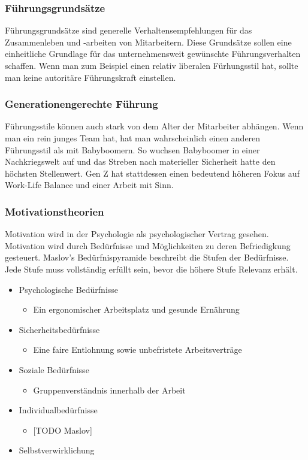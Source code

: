 \documentclass{article}
\begin{document}
	 \subsubsection{Führungsgrundsätze}
	 Führungsgrundsätze sind generelle Verhaltensempfehlungen für das Zusammenleben und -arbeiten von Mitarbeitern. Diese Grundsätze sollen eine einheitliche Grundlage für das unternehmensweit gewünschte Führungsverhalten schaffen. Wenn man zum Beispiel einen relativ liberalen Fürhungsstil hat, sollte man keine autoritäre Führungskraft einstellen.
	 \subsubsection{Generationengerechte Führung}
	 Führungsstile können auch stark von dem Alter der Mitarbeiter abhängen. Wenn man ein rein junges Team hat, hat man wahrscheinlich einen anderen Führungsstil als mit Babyboomern. So wuchsen Babyboomer in einer Nachkriegswelt auf und das Streben nach materieller Sicherheit hatte den höchsten Stellenwert. Gen Z hat stattdessen einen bedeutend höheren Fokus auf Work-Life Balance und einer Arbeit mit Sinn.
	 \subsubsection{Motivationstheorien}
	 Motivation wird in der Psychologie als psychologischer Vertrag gesehen. Motivation wird durch Bedürfnisse und Möglichkeiten zu deren Befriedigkung gesteuert. Maslov's Bedürfnispyramide beschreibt die Stufen der Bedürfnisse. Jede Stufe muss vollständig erfüllt sein, bevor die höhere Stufe Relevanz erhält.
	 \begin{itemize}
	 	\item{Psychologische Bedürfnisse}
	 	\begin{itemize}
	 		\item{Ein ergonomischer Arbeitsplatz und gesunde Ernährung}
	 	\end{itemize}
	 	\item{Sicherheitsbedürfnisse}
	 	\begin{itemize}
	 		\item{Eine faire Entlohnung sowie unbefristete Arbeitsverträge}
	 	\end{itemize}
	 	\item{Soziale Bedürfnisse}
	 	\begin{itemize}
	 		\item{Gruppenverständnis innerhalb der Arbeit}
	 	\end{itemize}
	 	\item{Individualbedürfnisse}
	 	\begin{itemize}
	 		\item{[TODO Maslov]}
	 	\end{itemize}
	 	\item{Selbstverwirklichung}
	 \end{itemize}
\end{document}
